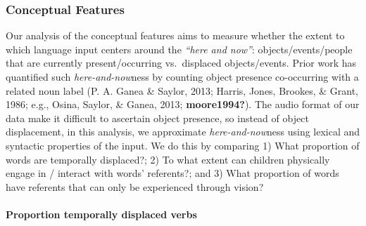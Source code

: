 \documentclass[
  man,floatsintext]{apa6}
\let\oldparagraph\paragraph
\renewcommand{\paragraph}[1]{\oldparagraph{#1}\mbox{}}
\begin{document}
\hypertarget{conceptual-features}{%
\subsubsection{Conceptual Features}\label{conceptual-features}}

Our analysis of the conceptual features aims to measure whether the extent to which language input centers around the \emph{``here and now''}: objects/events/people that are currently present/occurring vs.~displaced objects/events. Prior work has quantified such \emph{here-and-now}ness by counting object presence co-occurring with a related noun label (P. A. Ganea \& Saylor, 2013; Harris, Jones, Brookes, \& Grant, 1986; e.g., Osina, Saylor, \& Ganea, 2013; \textbf{moore1994?}). The audio format of our data make it difficult to ascertain object presence, so instead of object displacement, in this analysis, we approximate \emph{here-and-now}ness using lexical and syntactic properties of the input. We do this by comparing 1) What proportion of words are temporally displaced?; 2) To what extent can children physically engage in / interact with words' referents?; and 3) What proportion of words have referents that can only be experienced through vision?

\hypertarget{proportion-temporally-displaced-verbs}{%
\paragraph{Proportion temporally displaced verbs}\label{proportion-temporally-displaced-verbs}}
\end{document}
